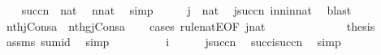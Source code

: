 \begin{isabellebody}
\ \ \isamarkupfalse%
\ {\isachardoublequoteopen}succ{\isacharparenleft}{\kern0pt}n{\isacharparenright}{\kern0pt}\ {\isasymin}\ nat{\isachardoublequoteclose}\ \isamarkupfalse%
\ {\isacartoucheopen}n{\isasymin}nat{\isacartoucheclose}\ \isamarkupfalse%
\ simp\isanewline
\ \ \isamarkupfalse%
\ \isamarkupfalse%
\ {\isachardoublequoteopen}j\ {\isasymin}\ nat{\isachardoublequoteclose}\ \isamarkupfalse%
\ {\isacartoucheopen}j{\isasymin}succ{\isacharparenleft}{\kern0pt}n{\isacharparenright}{\kern0pt}{\isacartoucheclose}\ in{\isacharunderscore}{\kern0pt}n{\isacharunderscore}{\kern0pt}in{\isacharunderscore}{\kern0pt}nat\ \isamarkupfalse%
\ blast\isanewline
\ \ \isamarkupfalse%
\ \isamarkupfalse%
\ {\isachardoublequoteopen}nth{\isacharparenleft}{\kern0pt}j{\isacharcomma}{\kern0pt}Cons{\isacharparenleft}{\kern0pt}a{\isacharcomma}{\kern0pt}{\isasymrho}{\isacharparenright}{\kern0pt}{\isacharparenright}{\kern0pt}\ {\isacharequal}{\kern0pt}\ nth{\isacharparenleft}{\kern0pt}{\isacharquery}{\kern0pt}g{\isacharbackquote}{\kern0pt}j{\isacharcomma}{\kern0pt}Cons{\isacharparenleft}{\kern0pt}a{\isacharcomma}{\kern0pt}{\isasymrho}{\isacharprime}{\kern0pt}{\isacharparenright}{\kern0pt}{\isacharparenright}{\kern0pt}{\isachardoublequoteclose}\isanewline
\ \ \isamarkupfalse%
\ {\isacharparenleft}{\kern0pt}cases\ rule{\isacharcolon}{\kern0pt}natE{\isacharbrackleft}{\kern0pt}OF\ {\isacartoucheopen}j{\isasymin}nat{\isacartoucheclose}{\isacharbrackright}{\kern0pt}{\isacharparenright}{\kern0pt}\isanewline
\ \ \ \ \isamarkupfalse%
\ {}\isanewline
\ \ \ \ \isamarkupfalse%
\ \isamarkupfalse%
\ {\isacharquery}{\kern0pt}thesis\ \isamarkupfalse%
\ assms\ sum{\isacharunderscore}{\kern0pt}id{}\ \isamarkupfalse%
\ simp\isanewline
\ \ \isamarkupfalse%
\isanewline
\ \ \ \ \isamarkupfalse%
\ {\isacharparenleft}{\kern0pt}{}\ i{\isacharparenright}{\kern0pt}\isanewline
\ \ \ \ \isamarkupfalse%
\ {\isacartoucheopen}j{\isasymin}succ{\isacharparenleft}{\kern0pt}n{\isacharparenright}{\kern0pt}{\isacartoucheclose}\ \isamarkupfalse%
\ {\isachardoublequoteopen}succ{\isacharparenleft}{\kern0pt}i{\isacharparenright}{\kern0pt}{\isasymin}succ{\isacharparenleft}{\kern0pt}n{\isacharparenright}{\kern0pt}{\isachardoublequoteclose}\ \isamarkupfalse%
\ simp\isanewline

\end{isabellebody}
